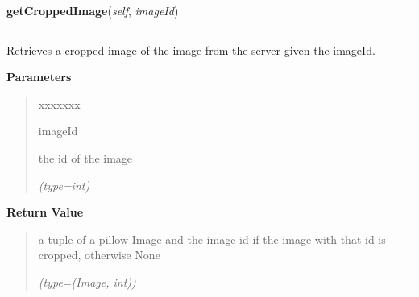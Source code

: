 \hspace{.8\funcindent}\begin{boxedminipage}{\funcwidth}

    \raggedright \textbf{getCroppedImage}(\textit{self}, \textit{imageId})

    \vspace{-1.5ex}

    \rule{\textwidth}{0.5\fboxrule}
\setlength{\parskip}{2ex}
    Retrieves a cropped image of the image from the server given the 
    imageId.

\setlength{\parskip}{1ex}
      \textbf{Parameters}
      \vspace{-1ex}

      \begin{quote}
        \begin{Ventry}{xxxxxxx}

          \item[imageId]

          the id of the image

            {\it (type=int)}

        \end{Ventry}

      \end{quote}

      \textbf{Return Value}
    \vspace{-1ex}

      \begin{quote}
      a tuple of a pillow Image and the image id if the image with that id 
      is cropped, otherwise None

      {\it (type=(Image, int))}

      \end{quote}

    \end{boxedminipage}

    \label{client_rest:ImagingInterface:getNextCroppedImage}

    \vspace{0.5ex}

